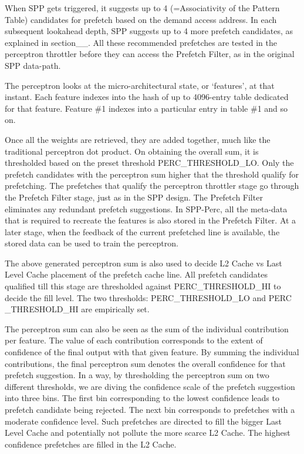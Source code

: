 \documentclass{sig-alternate}
\begin{document}
When SPP gets triggered, it suggests up to 4 (=Associativity of the Pattern Table) candidates for prefetch based on the demand access address. 
In each subsequent lookahead depth, SPP suggests up to 4 more prefetch candidates, as explained in section\_\_. 
All these recommended prefetches are tested in the perceptron throttler before they can access the Prefetch Filter, as in the original SPP data-path.

The perceptron looks at the micro-architectural state, or `features', at that instant. 
Each feature indexes into the hash of up to 4096-entry table dedicated for that feature. 
Feature \#1 indexes into a particular entry in table \#1 and so on. 

Once all the weights are retrieved, they are added together, much like the traditional perceptron dot product. 
On obtaining the overall sum, it is thresholded based on the preset threshold PERC\_THRESHOLD\_LO. 
Only the prefetch candidates with the perceptron sum higher that the threshold qualify for prefetching. 
The prefetches that qualify the perceptron throttler stage go through the Prefetch Filter stage, just as in the SPP design.
The Prefetch Filter eliminates any redundant prefetch suggestions.
In SPP-Perc, all the meta-data that is required to recreate the features is also stored in the Prefetch Filter. 
At a later stage, when the feedback of the current prefetched line is available, the stored data can be used to train the perceptron. 

The above generated perceptron sum is also used to decide L2 Cache vs Last Level Cache placement of the prefetch cache line. 
All prefetch candidates qualified till this stage are thresholded against PERC\_THRESHOLD\_HI to decide the fill level. The two thresholds: PERC\_THRESHOLD\_LO and PERC \_THRESHOLD\_HI are empirically set. 

The perceptron sum can also be seen as the sum of the individual contribution per feature.
The value of each contribution corresponds to the extent of confidence of the final output with that given feature.
By summing the individual contributions, the final perceptron sum denotes the overall confidence for that prefetch suggestion. 
In a way, by thresholding the perceptron sum on two different thresholds, we are diving the confidence scale of the prefetch suggestion into three bins.
The first bin corresponding to the lowest confidence leads to prefetch candidate being rejected.
The next bin corresponds to prefetches with a moderate confidence level. 
Such prefetches are directed to fill the bigger Last Level Cache and potentially not pollute the more scarce L2 Cache.
The highest confidence prefetches are filled in the L2 Cache.
\end{document}
